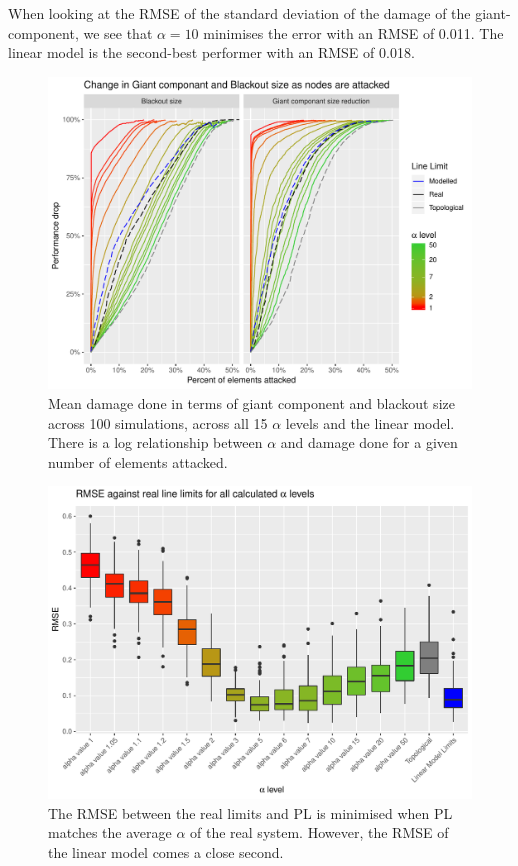 \documentclass{article}
\begin{document}
When looking at the RMSE of the standard deviation of the damage of the giant-component, we see that $\alpha = 10$ minimises the error with an RMSE of 0.011. The linear model is the second-best performer with an RMSE of 0.018. 

\begin{figure}
    \centering
    \includegraphics{Figures/GCandBlackoutChange.pdf}
    \caption{Mean damage done in terms of giant component and blackout size across 100 simulations, across all 15 $\alpha$ levels and the linear model. There is a log relationship between $\alpha$ and damage done for a given number of elements attacked.}
    \label{fig:DamageDone}
\end{figure}


\begin{figure}
    \centering
    \includegraphics{Figures/RMSEChange.pdf}
    \caption{The RMSE between the real limits and PL is minimised when PL matches the average $\alpha$ of the real system. However, the RMSE of the linear model comes a close second.}
    \label{fig:RMSEchange}
\end{figure}
\end{document}
